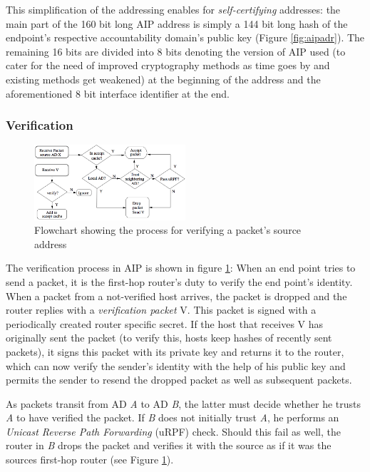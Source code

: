\documentclass{acm_proc_article-sp}
\begin{document}
This simplification of the addressing enables for \emph{self-certifying} addresses: the main part of the 160 bit long AIP address is simply a 144 bit long hash of the endpoint's respective accountability domain's public key (Figure \ref{fig:aipadr}). The remaining 16 bits are divided into 8 bits denoting the version of AIP used (to cater for the need of improved cryptography methods as time goes by and existing methods get weakened) at the beginning of the address and the aforementioned 8 bit interface identifier at the end.

\subsubsection{Verification}
\begin{figure}[t]
  \includegraphics[width=0.5\textwidth]{images/aipflow.PNG}
  \caption{Flowchart showing the process for verifying a packet's source address \cite{aip}}
  \label{fig:aipflow}
\end{figure}
The verification process in AIP is shown in figure \ref{fig:aipflow}: When an end point tries to send a packet, it is the first-hop router's duty to verify the end point's identity. When a packet from a not-verified host arrives, the packet is dropped and the router replies with a \emph{verification packet} V. This packet is signed with a periodically created router specific secret. If the host that receives V has originally sent the packet (to verify this, hosts keep hashes of recently sent packets), it signs this packet with its private key and returns it to the router, which can now verify the sender's identity with the help of his public key and permits the sender to resend the dropped packet as well as subsequent packets.

As packets transit from AD \emph{A} to AD \emph{B}, the latter must decide whether he trusts \emph{A} to have verified the packet. If \emph{B} does not initially trust \emph{A}, he performs an \emph{Unicast Reverse Path Forwarding} (uRPF) check. Should this fail as well, the router in \emph{B} drops the packet and verifies it with the source as if it was the sources first-hop router (see Figure \ref{fig:aipflow}).
\end{document}
